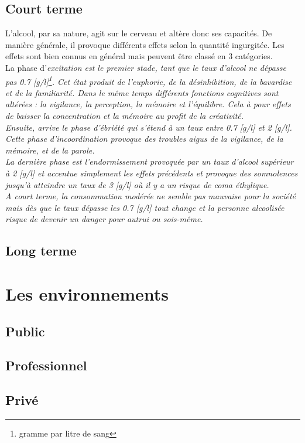 \documentclass[a4paper, 14pt]{extarticle}
\begin{document}
  \subsection{Court terme}
  L'alcool, par sa nature, agit sur le cerveau et altère donc ses capacités. De manière générale, il provoque différents effets selon la quantité ingurgitée. Les effets sont bien connus en général mais peuvent être classé en 3 catégories.\\
  La phase d'\em{}excitation\em{} est le premier stade, tant que le taux d'alcool ne dépasse pas 0.7 [g/l]\footnote{gramme par litre de sang}. Cet état produit de l'euphorie, de la désinhibition, de la bavardise et de la familiarité. Dans le même temps différents fonctions cognitives sont altérées : la vigilance, la perception, la mémoire et l'équilibre. Cela à pour effets de baisser la concentration et la mémoire au profit de la créativité.\\
  Ensuite, arrive le phase d'\em{}ébriété\em{} qui s'étend à un taux entre 0.7 [g/l] et 2 [g/l]. Cette phase d'incoordination provoque des troubles aigus de la vigilance, de la mémoire, et de la parole.\\
  La dernière phase est l'\em{}endormissement\em{} provoquée par un taux d'alcool supérieur à 2 [g/l] et accentue simplement les effets précédents et provoque des somnolences jusqu'à atteindre un taux de 3 [g/l] où il y a un risque de coma éthylique.\\
  A court terme, la consommation modérée ne semble pas mauvaise pour la société mais dès que le taux dépasse les 0.7 [g/l] tout change et la personne alcoolisée risque de devenir un danger pour autrui ou sois-même.
	\subsection{Long terme}
	\section{Les environnements}
	\subsection{Public}
	\subsection{Professionnel}
	\subsection{Privé}
\end{document}
